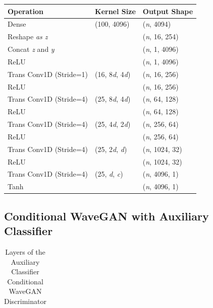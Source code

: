 \documentclass[a4paper, titlepage]{article}
\begin{document}
\begin{appendices}
\begin{table}[ht]
\begin{center}
\begin{tabular}{ l | l | l}
        Operation & Kernel Size & Output Shape \\
        \hline
        Dense & (100, 4096) & ({\it n}, 4094) \\
        Reshape {\it as z} & & ({\it n}, 16, 254) \\
        Concat {\it z} and {\it y} & & ({\it n}, 1, 4096) \\
        ReLU & & ({\it n}, 1, 4096) \\
        Trans Conv1D (Stride=1) & (16, 8{\it d}, 4{\it d}) & ({\it n}, 16, 256) \\
        ReLU & & ({\it n}, 16, 256) \\
        Trans Conv1D (Stride=4) & (25, 8{\it d}, 4{\it d}) & ({\it n}, 64, 128) \\
        ReLU & & ({\it n}, 64, 128) \\
        Trans Conv1D (Stride=4) & (25, 4{\it d}, 2{\it d}) & ({\it n}, 256, 64) \\
        ReLU & & ({\it n}, 256, 64) \\
        Trans Conv1D (Stride=4) & (25, 2{\it d}, {\it d}) & ({\it n}, 1024, 32) \\
        ReLU & & ({\it n}, 1024, 32) \\
        Trans Conv1D (Stride=4) & (25, {\it d}, {\it c}) & ({\it n}, 4096, 1) \\
        Tanh & & ({\it n}, 4096, 1) \\

      \end{tabular}
    \end{center}
    
  \end{table}

  \clearpage

  \subsection{Conditional WaveGAN with Auxiliary Classifier}

  \begin{table}[ht]
    
    \caption{Layers of the Auxiliary Classifier Conditional WaveGAN Discriminator}
    \label{tab:ACGAN_Dis}
    
    \begin{center}
      \begin{tabular}{ l | l | l}
        

\end{tabular}
\end{center}
\end{table}
\end{appendices}
\end{document}

